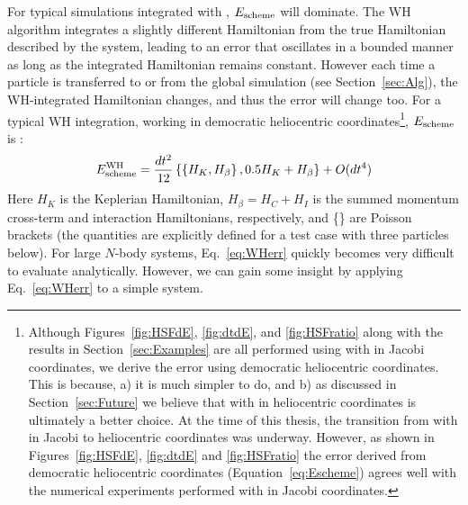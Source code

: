 For typical simulations integrated with \hermes, $E_{\rm scheme}$ will dominate. 
The WH algorithm integrates a slightly different Hamiltonian from the true Hamiltonian described by the system, leading to an error that oscillates in a bounded manner as long as the integrated Hamiltonian remains constant.
However each time a particle is transferred to or from the global simulation (see Section~\ref{sec:Alg}), the WH-integrated Hamiltonian changes, and thus the error will change too.
For a typical WH integration, working in democratic heliocentric coordinates\footnote{Although Figures~\ref{fig:HSFdE}, \ref{fig:dtdE}, and \ref{fig:HSFratio} along with the results in Section~\ref{sec:Examples} are all performed using \hermes with \whfast in Jacobi coordinates, we derive the error using democratic heliocentric coordinates. This is because, a) it is much simpler to do, and b) as discussed in Section~\ref{sec:Future} we believe that \hermes with \whfast in heliocentric coordinates is ultimately a better choice. At the time of this thesis, the transition from \hermes with \whfast in Jacobi to heliocentric coordinates was underway. However, as shown in Figures~\ref{fig:HSFdE}, \ref{fig:dtdE} and \ref{fig:HSFratio} the error derived from democratic heliocentric coordinates (Equation~\ref{eq:Escheme}) agrees well with the numerical experiments performed with \whfast in Jacobi coordinates.}, $E_{\rm scheme}$ is \citep[e.g.][]{Saha1994,Wisdom2006}:
\begin{equation}
E_{\rm scheme}^{\rm WH} = \frac{dt^2}{12} \left \{ \left \{H_K, H_{\beta} \right \},  0.5H_K + H_{\beta} \right \} + O(dt^4)
\label{eq:WHerr}
\end{equation}
Here $H_K$ is the Keplerian Hamiltonian, $H_{\beta} = H_C + H_I$ is the summed momentum cross-term and interaction Hamiltonians, respectively, and \{\} are Poisson brackets (the quantities are explicitly defined for a test case with three particles below). 
For large $N$-body systems, Eq.~\ref{eq:WHerr} quickly becomes very difficult to evaluate analytically. 
However, we can gain some insight by applying Eq.~\ref{eq:WHerr} to a simple system. 


